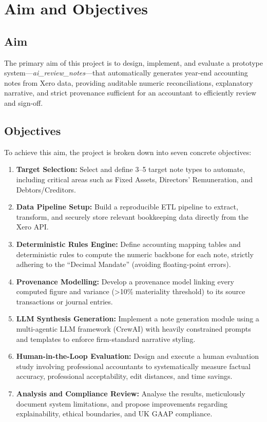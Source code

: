 \chapter{Aim and Objectives}
\label{chap:aim_and_objectives}

\section{Aim}
The primary aim of this project is to design, implement, and evaluate a prototype system—\textit{ai\_review\_notes}—that automatically generates year-end accounting notes from Xero data, providing auditable numeric reconciliations, explanatory narrative, and strict provenance sufficient for an accountant to efficiently review and sign-off.

\section{Objectives}
To achieve this aim, the project is broken down into seven concrete objectives:
\begin{enumerate}
    \item \textbf{Target Selection:} Select and define 3–5 target note types to automate, including critical areas such as Fixed Assets, Directors' Remuneration, and Debtors/Creditors.
    \item \textbf{Data Pipeline Setup:} Build a reproducible ETL pipeline to extract, transform, and securely store relevant bookkeeping data directly from the Xero API.
    \item \textbf{Deterministic Rules Engine:} Define accounting mapping tables and deterministic rules to compute the numeric backbone for each note, strictly adhering to the ``Decimal Mandate'' (avoiding floating-point errors).
    \item \textbf{Provenance Modelling:} Develop a provenance model linking every computed figure and variance (>10\% materiality threshold) to its source transactions or journal entries.
    \item \textbf{LLM Synthesis Generation:} Implement a note generation module using a multi-agentic LLM framework (CrewAI) with heavily constrained prompts and templates to enforce firm-standard narrative styling.
    \item \textbf{Human-in-the-Loop Evaluation:} Design and execute a human evaluation study involving professional accountants to systematically measure factual accuracy, professional acceptability, edit distances, and time savings.
    \item \textbf{Analysis and Compliance Review:} Analyse the results, meticulously document system limitations, and propose improvements regarding explainability, ethical boundaries, and UK GAAP compliance.
\end{enumerate}

